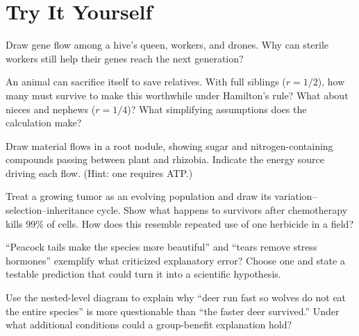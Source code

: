 \section*{Try It Yourself}

\begin{sikaoti}
\item Draw gene flow among a hive's queen, workers, and drones. Why can sterile workers still help their genes reach the next generation?
\item An animal can sacrifice itself to save relatives. With full siblings ($r=1/2$), how many must survive to make this worthwhile under Hamilton's rule? What about nieces and nephews ($r=1/4$)? What simplifying assumptions does the calculation make?
\item Draw material flows in a root nodule, showing sugar and nitrogen-containing compounds passing between plant and rhizobia. Indicate the energy source driving each flow. (Hint: one requires ATP.)
\item Treat a growing tumor as an evolving population and draw its variation--selection--inheritance cycle. Show what happens to survivors after chemotherapy kills 99\% of cells. How does this resemble repeated use of one herbicide in a field?
\item ``Peacock tails make the species more beautiful'' and ``tears remove stress hormones'' exemplify what criticized explanatory error? Choose one and state a testable prediction that could turn it into a scientific hypothesis.
\item Use the nested-level diagram to explain why ``deer run fast so wolves do not eat the entire species'' is more questionable than ``the faster deer survived.'' Under what additional conditions could a group-benefit explanation hold?
\end{sikaoti}
